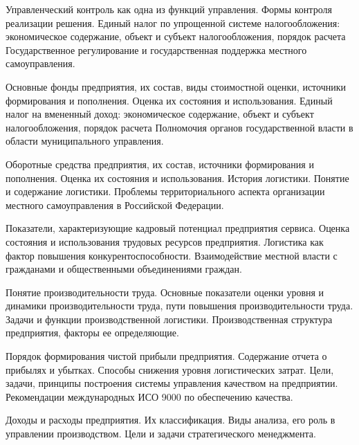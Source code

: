 \documentclass[
	11pt,
	a4paper,
	]
	{article}
\begin{document}
\bigskip

\noindent{} 
	{
		Управленческий контроль как одна из функций управления. Формы контроля реализации решения.
	}{
		Единый налог по упрощенной системе налогообложения: экономическое содержание, объект и субъект налогообложения, порядок расчета
	}{
		Государственное регулирование и государственная поддержка местного самоуправления.
	}

\bigskip

\noindent{} 
	{
		Основные фонды предприятия, их состав, виды стоимостной оценки, источники формирования и пополнения. Оценка их состояния и использования.
	}{
		Единый налог на вмененный доход: экономическое содержание, объект и субъект налогообложения, порядок расчета
	}{
		Полномочия органов государственной власти в области муниципального управления.
	}

\bigskip

\noindent{} 
	{
		Оборотные средства предприятия, их состав, источники формирования и пополнения. Оценка их состояния и использования.
	}{
		История логистики. Понятие и содержание логистики.
	}{
		Проблемы территориального аспекта организации местного самоуправления в Российской Федерации.
	}

\bigskip

\noindent{} 
	{
		Показатели, характеризующие кадровый потенциал предприятия сервиса. Оценка состояния и использования трудовых ресурсов предприятия.
	}{
		Логистика как фактор повышения конкурентоспособности.
	}{
		Взаимодействие местной власти с гражданами и общественными объединениями граждан.
	}

\bigskip

\noindent{} 
	{
		Понятие производительности труда. Основные показатели оценки уровня и динамики производительности труда, пути повышения производительности труда.
	}{
		Задачи и функции производственной логистики.
	}{
		Производственная структура предприятия, факторы ее определяющие.
	}

\bigskip

\noindent{} 
	{
		Порядок формирования чистой прибыли предприятия. Содержание отчета о прибылях и убытках.
	}{
		Способы снижения уровня логистических затрат.
	}{
		Цели, задачи, принципы построения системы управления качеством на предприятии. Рекомендации международных ИСО 9000 по обеспечению качества.
	}

\bigskip

\noindent{} 
	{
		Доходы и расходы предприятия. Их классификация.
	}{
		Виды анализа, его роль в управлении производством.
	}{
		Цели и задачи стратегического менеджмента.
	}
\end{document}
